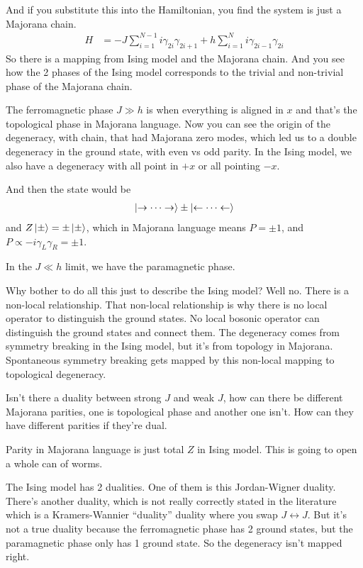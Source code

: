 And if you substitute this into the Hamiltonian,
you find the system is just a Majorana chain.
\begin{align}
    H &=
    - J \sum_{i=1}^{N-1} i \gamma_{2i} \gamma_{2i + 1}
    + h\sum_{i=1}^{N} i \gamma_{2i - 1}\gamma_{2i}
\end{align}
So there is a mapping from Ising model and the Majorana chain.
And you see how the 2 phases of the Ising model corresponds to the trivial and
non-trivial phase of the Majorana chain.


The ferromagnetic phase $J\gg h$ is when everything is aligned  in $x$ and
that's the
topological phase in Majorana language.
Now you can see the origin of the degeneracy,
with chain,
that had Majorana zero modes,
which led us to a double degeneracy in the ground state,
with even vs odd parity.
In the Ising model,
we also have a degeneracy with all point in $+x$ or all pointing $-x$.


And then the state would be
\begin{align}
    \ket{\rightarrow \cdots \rightarrow}
    \pm
    \ket{\leftarrow \cdots \leftarrow}
\end{align}
and $Z\ket{\pm} = \pm \ket{\pm}$,
which in Majorana language means
$P= \pm 1$,
and $P \propto -i\gamma_L \gamma_R = \pm 1$.

In the $J\ll h$ limit,
we have the paramagnetic phase.

Why bother to do all this just to describe the Ising model?
Well no.
There is a non-local relationship.
That non-local relationship is why there is no local operator to distinguish the
ground states.
No local bosonic operator can distinguish the ground states and connect them.
The degeneracy comes from symmetry breaking in the Ising model,
but it's from topology in Majorana.
Spontaneous symmetry breaking
gets mapped by this non-local mapping to topological degeneracy.

\begin{question}
    Isn't there a duality between strong $J$ and weak $J$,
    how can there be different Majorana parities,
    one is topological phase and another one isn't.
    How can they have different parities if they're dual.
\end{question}
Parity in Majorana language is just total $Z$ in Ising model.
This is going to open a whole can of worms.

The Ising model has 2 dualities.
One of them is this Jordan-Wigner duality.
There's another duality,
which is not really correctly stated in the literature which is a
Kramers-Wannier ``duality'' duality where you swap
$J\leftrightarrow J$.
But it's not a true duality
because the ferromagnetic phase has 2 ground states,
but the paramagnetic phase only has 1 ground state.
So the degeneracy isn't mapped right.


